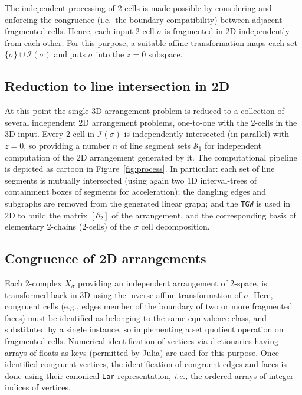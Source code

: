 \documentclass{juliacon}
\begin{document}
The independent processing of 2-cells is made possible by considering and enforcing the congruence (i.e.~the boundary compatibility) between adjacent fragmented cells. Hence, each input 2-cell $\sigma$ is fragmented in 2D independently from each other.  For this purpose,  a suitable affine transformation maps each set $\{\sigma\}\cup\mathcal{I}(\sigma)$ and puts $\sigma$ into the $z=0$ subspace.


\subsection{Reduction to line intersection in 2D}
At this point the single 3D arrangement problem is reduced to a collection of several independent 2D arrangement problems, one-to-one with the 2-cells in the 3D input. Every 2-cell in $\mathcal{I}(\sigma)$ is independently intersected (in parallel) with $z=0$, so providing a number $n$ of line segment sets $\mathcal{S}_1$ for independent computation of the 2D arrangement generated by it. The computational pipeline is depicted as cartoon in Figure~\ref{fig:process}. In particular: each set of line segments is mutually intersected (using again two 1D interval-trees of containment boxes of segments for acceleration); the dangling edges and subgraphs are removed from the generated linear graph; and the \texttt{TGW} is used in 2D to build the matrix $[\partial_2]$ of the arrangement, and the corresponding basis of elementary 2-chains (2-cells) of the  $\sigma$ cell decomposition.


\subsection{Congruence of 2D arrangements}
Each 2-complex $X_\sigma$ providing an independent arrangement of 2-space, is transformed back in 3D using the inverse affine transformation of $\sigma$. Here, congruent cells (e.g., edges member of the boundary of two or more fragmented faces) must be identified as belonging to the same equivalence class, and substituted by a single instance, so implementing a set quotient operation on fragmented cells. Numerical identification of vertices via dictionaries having arrays of floats as keys (permitted by Julia) are used for this purpose. Once identified congruent vertices, the identification of congruent edges and faces is done using their canonical \texttt{Lar} representation, \emph{i.e.,} the ordered arrays of integer indices of vertices. 
\end{document}
